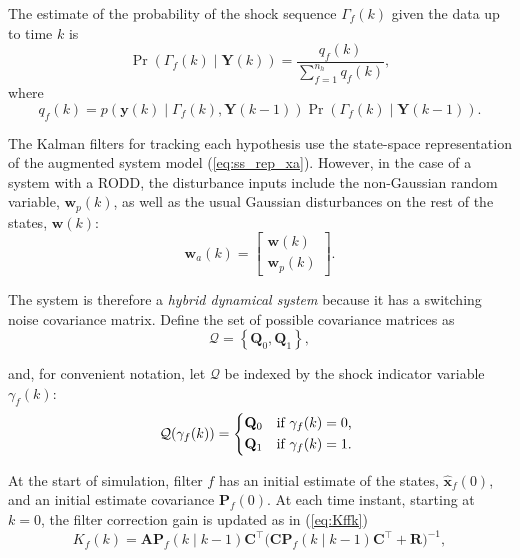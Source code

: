 The estimate of the probability of the shock sequence $\Gamma_f(k)$ given the data up to time $k$ is
\begin{equation} \label{eq:Pr_Gammak_given_Yk}
	\Pr(\Gamma_f(k) \mid \mathbf{Y}(k)) = \frac{q_f(k)}{\sum_{f=1}^{n_h} q_f(k)},
\end{equation}
where
\begin{equation} \label{eq:qfk}
	q_f(k) = p(\mathbf{y}(k) \mid \Gamma_f(k), \mathbf{Y}(k-1)) \Pr(\Gamma_f(k) \mid \mathbf{Y}(k-1)).
\end{equation}

The Kalman filters for tracking each hypothesis use the state-space representation of the augmented system model (\ref{eq:ss_rep_xa}). 
However, in the case of a system with a RODD, the disturbance inputs include the non-Gaussian random variable, $\mathbf{w}_p(k)$, as well as the usual Gaussian disturbances on the rest of the states, $\mathbf{w}(k)$:
\begin{equation} \label{eq:wak}
	\mathbf{w}_a(k) = \begin{bmatrix}
		\mathbf{w}(k) \\
		\mathbf{w}_p(k)
	\end{bmatrix}.
\end{equation}

The system is therefore a \textit{hybrid dynamical system} because it has a switching noise covariance matrix. Define the set of possible covariance matrices as
\begin{equation} \label{eq:init_Q_R}
	\mathcal{Q} = \left\{\mathbf{Q}_0, \mathbf{Q}_1\right\},
\end{equation}

and, for convenient notation, let $\mathcal{Q}$ be indexed by the shock indicator variable $\gamma_f(k)$:
\begin{equation} \label{eq:init_Q}
	\mathcal{Q}(\gamma_f(k)) = 
	\begin{cases*}
		\mathbf{Q}_0 & \text{if} $\gamma_f(k)=0$, \\
		\mathbf{Q}_1 & \text{if} $\gamma_f(k)=1$.
	\end{cases*}
\end{equation}

At the start of simulation, filter $f$ has an initial estimate of the states, $\mathbf{\hat{x}}_f(0)$, and an initial estimate covariance $\mathbf{P}_f(0)$. At each time instant, starting at $k=0$, the filter correction gain is updated as in (\ref{eq:Kffk})
\begin{equation} \label{eq:Kffk}
	K_f(k) = \mathbf{A}\mathbf{P}_f(k \mid k-1)\mathbf{C}^\intercal \big(\mathbf{C}\mathbf{P}_f(k \mid k-1)\mathbf{C}^\intercal + \mathbf{R}\big)^{-1},
\end{equation}

